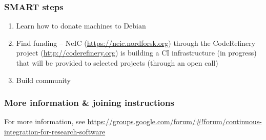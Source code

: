 \subsubsection{SMART steps}

\begin{enumerate}
\item Learn how to donate machines to Debian
\item Find funding -- NeIC (\url{https://neic.nordforsk.org}) through the CodeRefinery project (\url{http://coderefinery.org}) is building a CI infrastructure (in progress) that will be provided to selected projects (through an open call)
\item Build community
\end{enumerate}


\subsubsection{More information \& joining instructions}

For more information, see \url{https://groups.google.com/forum/#!forum/continuous-integration-for-research-software}


